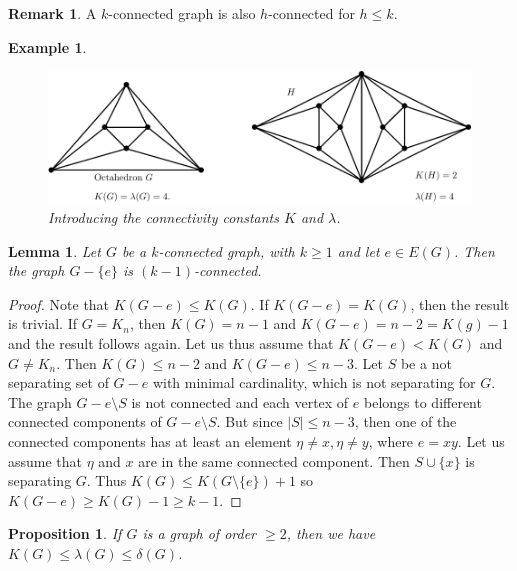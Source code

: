 \documentclass[12pt,a4paper]{article}
\newtheorem{lem}{Lemma}[section]
\newtheorem{prop}{Proposition}[section]
\newtheorem{exmp}{Example}[section]
\theoremstyle{definition}
\newtheorem{rem}{Remark}[section]
\begin{document}
\begin{rem} A $k$-connected graph is also $h$-connected for $h \leq k$. 
\end{rem}
\begin{exmp}\
\begin{figure}[hbtp]
\centering
\includegraphics[scale=.8]{images/graph21.pdf}
\caption{Introducing the connectivity constants $K$ and $\lambda$.}
\end{figure}

\end{exmp}
\begin{lem} Let $G$ be a $k$-connected graph, with $k \geq 1$ and let $e \in E(G)$. Then the graph $G-\{e\}$ is $(k-1)$-connected.
\end{lem}
\begin{proof}
Note that $K(G-e) \leq K(G).$ If $K(G-e)=K(G)$, then the result is trivial. If $G=K_n$, then $K(G)=n-1$ and $K(G-e)=n-2=K(g)-1$ and the result follows again. Let us thus assume that $K(G-e) < K(G)$ and $G \neq K_n.$ Then $K(G) \leq n-2$ and $K(G-e) \leq n-3 $. Let $S$ be a not separating set of $G-e$ with minimal cardinality, which is not separating for $G$. The graph $G-e \setminus S$ is not connected and each vertex of $e$ belongs to different connected components of $G-e \setminus S$. But since $|S| \leq n-3$, then one of the connected components has at least an element $\eta \neq x, \eta \neq y$, where $e=xy$. Let us assume that $\eta$ and $x$ are in the same connected component. Then $S \cup \{x\}$ is separating $G$. Thus $K(G) \leq K(G \setminus \{e\}) +1$ so $K(G-e) \geq K(G)-1 \geq k-1$. 
\end{proof}
\newpage
\begin{prop} If $G$ is a graph of order $\geq 2$, then we have $K(G) \leq \lambda (G) \leq \delta(G)$. 
\end{prop}
\end{document}
